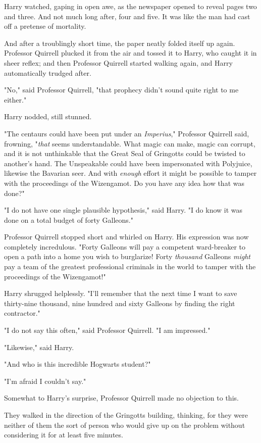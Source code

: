 Harry watched, gaping in open awe, as the newspaper opened to reveal pages two 
and three. And not much long after, four and five. It was like the man had cast 
off a pretense of mortality.

And after a troublingly short time, the paper neatly folded itself up again. 
Professor Quirrell plucked it from the air and tossed it to Harry, who caught 
it in sheer reflex; and then Professor Quirrell started walking again, and 
Harry automatically trudged after.

"No," said Professor Quirrell, "that prophecy didn't sound quite right to me 
either."

Harry nodded, still stunned.

"The centaurs could have been put under an \emph{Imperius}," Professor Quirrell 
said, frowning, "\emph{that} seems understandable. What magic can make, magic 
can corrupt, and it is not unthinkable that the Great Seal of Gringotts could 
be twisted to another's hand. The Unspeakable could have been impersonated with 
Polyjuice, likewise the Bavarian seer. And with \emph{enough} effort it might 
be possible to tamper with the proceedings of the Wizengamot. Do you have any 
idea how that was done?"

"I do not have one single plausible hypothesis," said Harry. "I do know it was 
done on a total budget of forty Galleons."

Professor Quirrell stopped short and whirled on Harry. His expression was now 
completely incredulous. "Forty Galleons will pay a competent ward-breaker to 
open a path into a home you wish to burglarize! Forty \emph{thousand} Galleons 
\emph{might} pay a team of the greatest professional criminals in the world to 
tamper with the proceedings of the Wizengamot!"

Harry shrugged helplessly. "I'll remember that the next time I want to save 
thirty-nine thousand, nine hundred and sixty Galleons by finding the right 
contractor."

"I do not say this often," said Professor Quirrell. "I am impressed."

"Likewise," said Harry.

"And who is this incredible Hogwarts student?"

"I'm afraid I couldn't say."

Somewhat to Harry's surprise, Professor Quirrell made no objection to this.

They walked in the direction of the Gringotts building, thinking, for they were 
neither of them the sort of person who would give up on the problem without 
considering it for at least five minutes.

